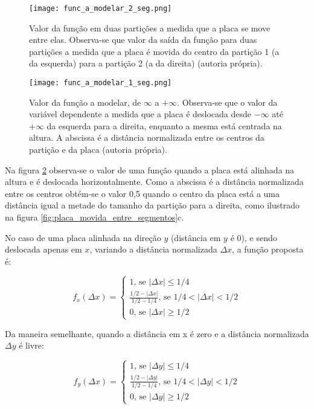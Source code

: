 \begin{figure}[!htb]
	\centering
	\texttt{[image: func\_a\_modelar\_2\_seg.png]}
	\caption[Valor da função em duas partições a medida que a placa se move
	entre elas]{
		Valor da função em duas partições a medida que a placa se move entre elas.
		Observa-se que valor da saída da função para duas partições a medida que a
		placa é movida do centro da partição 1 (a da esquerda) para a partição 2 (a
		da direita) (autoria própria).}
	\label{fig:func_a_modelar_2_seg}
\end{figure}

\begin{figure}[!htb]
	\centering
	\texttt{[image: func\_a\_modelar\_1\_seg.png]}
	\caption[Valor da função a modelar, de $\infty$ a $+\infty$]{
		Valor da função a modelar, de $\infty$ a $+\infty$.
		Observa-se que o valor da variável dependente a medida que a placa
		é deslocada desde $-\infty$ até $+\infty$ da esquerda para a direita,
		enquanto a mesma está centrada na altura. A abscissa é a distância
		normalizada entre os centros da partição e da placa (autoria própria).}
	\label{fig:func_a_modelar_1_seg}
\end{figure}

Na figura \ref{fig:func_a_modelar_1_seg} observa-se o valor de uma função
quando a placa está alinhada na altura e é deslocada horizontalmente. Como
a abscissa é a distância normalizada entre os centros obtém-se o valor 0,5
quando o centro da placa está a uma distância igual a metade do tamanho da
partição para a direita, como ilustrado na figura
\ref{fig:placa_movida_entre_segmentos}c.

No caso de uma placa alinhada na direção $y$ (distância em $y$ é 0), e sendo
deslocada apenas em $x$, variando a distância normalizada $\Delta x$, a função
proposta é:

\begin{equation}
	f_x(\Delta x) = \begin{cases}
		1 \text{, se } |\Delta x| \leq 1/4
		\\
		\frac{1/2-|\Delta x|}{1/2-1/4} \text{, se } 1/4<|\Delta x|<1/2
		\\
		0 \text{, se } |\Delta x| \geq 1/2
	\end{cases}
\end{equation}

Da maneira semelhante, quando a distância em x é zero e a distância 
normalizada $\Delta y$ é livre:

\begin{equation}
	f_y(\Delta x) = \begin{cases}
		1 \text{, se } |\Delta y| \leq 1/4
		\\
		\frac{1/2-|\Delta y|}{1/2-1/4} \text{, se } 1/4<|\Delta y|<1/2
		\\
		0 \text{, se } |\Delta y| \geq 1/2
	\end{cases}
\end{equation}

